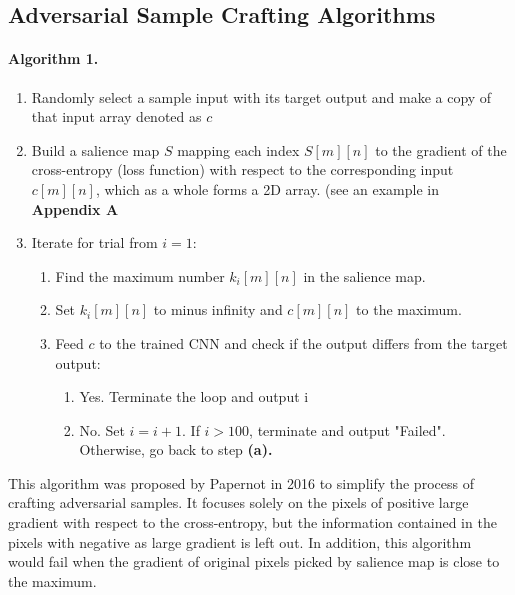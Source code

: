 \documentclass{article}
\begin{document}
\subsection{Adversarial Sample Crafting Algorithms}
\paragraph{Algorithm 1.}
\begin{enumerate}

\item Randomly select a sample input with its target output and make a copy of that input array denoted as $c$

\item Build a salience map $S$ mapping each index $S[m][n]$ to the gradient of the cross-entropy (loss function) with respect to the corresponding input $c[m][n]$, which as a whole forms a 2D array. (see an example in \textbf{Appendix A}

\item Iterate for trial from $i=1$:

\begin{enumerate}
	\item Find the maximum number $k_i[m][n]$ in the salience map.

	\item Set $k_i[m][n]$ to minus infinity  and $c[m][n]$ to the maximum.

	\item Feed $c$ to the trained CNN and check if the output differs from the target output:
		\begin{enumerate}
			\item Yes. Terminate the loop and output i
			\item No. Set $i=i+1$. If $i > 100$, terminate and output "Failed". Otherwise, go back to step \textbf{(a).}
		\end{enumerate}
\end{enumerate}
\end{enumerate}

This algorithm was proposed by Papernot\cite{Papernot} in 2016 to simplify the process of crafting adversarial samples. It focuses solely on the pixels of positive large gradient with respect to the cross-entropy, but the information contained in the pixels with negative as large gradient is left out.
In addition, this algorithm would fail when the gradient of original pixels picked by salience map is close to the maximum.\cite{Papernot2}
\end{document}
